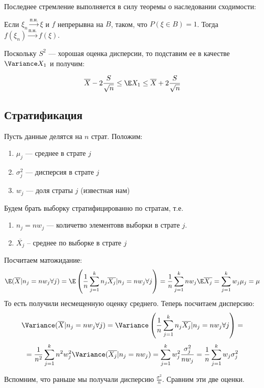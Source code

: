 Последнее стремление выполняется в силу теоремы о наследовании сходимости:

\begin{theorem}
    Если \(\xi_n \xrightarrow{\text{п.н.}} \xi\) и \(f\) непрерывна на \(B\), таком, что \(P(\xi \in B) = 1\). Тогда \(f(\xi_n) \xrightarrow{\text{п.н.}}f(\xi)\).
\end{theorem}
    
Поскольку \(S^2\) --- хорошая оценка дисперсии, то подставим ее в качестве \(\Variance X_1\) и получим:

\[\overline{X} - 2\frac{S}{\sqrt{n}} \le \E X_1 \le \overline{X} + 2\frac{S}{\sqrt{n}}\]

\subsection{Стратификация}
Пусть данные делятся на \(n\) страт. Положим:
\begin{enumerate}
    \item \(\mu_j\) --- среднее в страте \(j\)
    \item \(\sigma^2_j\) --- дисперсия в страте \(j\)
    \item \(w_j\) --- доля страты \(j\) (известная нам)
\end{enumerate}

Будем брать выборку стратифицированно по стратам, т.е.
\begin{enumerate}
    \item \(n_j = n w_j\) --- количетво элементовв выборки в страте \(j\).
    \item \(\overline{X_j}\) -- среднее по выборке в страте \(j\)
\end{enumerate}

Посчитаем матожидание:
\[\E (\overline{X} | n_j = n w_j \forall j) = \E\left( \frac{1}{n}\sum_{j = 1}^k n_j \overline{X_j} | n_j = n w_j \forall j\right) = \frac{1}{n}\sum_{j = 1}^k nw_j \E \overline{X_j} = \sum_{j = 1}^k w_j\mu_j = \mu\]
То есть получили несмещенную оценку среднего. Теперь посчитаем дисперсию:
\[\Variance (\overline{X} | n_j = n w_j \forall j) = \Variance\left( \frac{1}{n}\sum_{j = 1}^k n_j \overline{X_j} | n_j = n w_j \forall j\right) = \]\[= \frac{1}{n^2}\sum_{j = 1}^k n^2w^2_j \Variance(\overline{X_j} | n_j = n w_j) = \sum_{j = 1}^k w^2_j \frac{\sigma_j^2}{nw_j} = \frac{1}{n}\sum_{j = 1}^k w_j\sigma_j^2\]

Вспомним, что раньше мы получали дисперсию \(\frac{\sigma^2}{n}\). Сравним эти две оценки.

